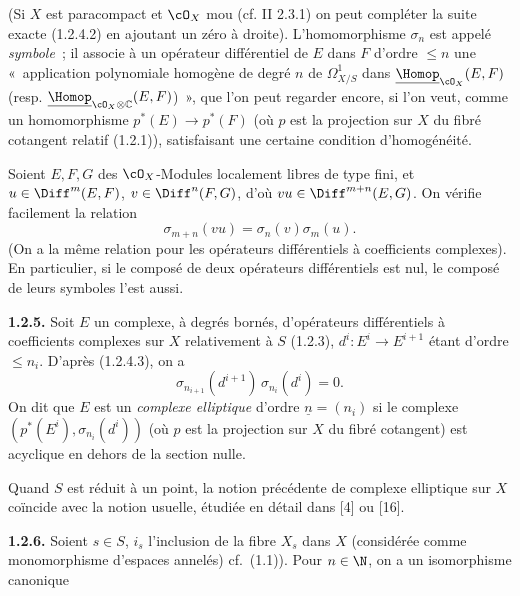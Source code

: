 (Si $X$ est
paracompact et $\cO_X$ mou (cf. II 2.3.1) on peut compléter la suite exacte (1.2.4.2) en ajoutant un zéro à droite). L'homomorphisme $\sigma_n$ est appelé \emph{symbole}~; il associe à un opérateur différentiel de $E$ dans $F$ d'ordre $\le n$ une «~application polynomiale homogène de degré $n$ de $\Omega^1_{X/S}$ dans $\underline{\Homop}_{\cO_X}(E,F)$ (resp. $\underline{\Homop}_{\cO_X\otimes\mathbb C}(E,F)$)~», que l'on peut regarder encore, si l'on veut, comme un homomorphisme $p^*(E)\longrightarrow p^*(F)$ (où $p$ est la projection sur $X$ du fibré cotangent relatif (1.2.1)), satisfaisant une certaine condition d'homogénéité.

Soient $E,F,G$ des $\cO_X$-Modules localement libres de type fini, et $u\in\Diff^m(E,F)$, $v\in\Diff^n(F,G)$, d'où $vu\in\Diff^{m+n}(E,G)$. On vérifie facilement la relation
\begin{equation}\tag{1.2.4.3}
  \sigma_{m+n}(vu)=\sigma_n(v)\sigma_m(u).
\end{equation}
(On a la même relation pour les opérateurs différentiels à coefficients complexes). En particulier, si le composé de deux opérateurs différentiels est nul, le composé de leurs symboles l'est aussi.

\textbf{1.2.5.} Soit $E$ un complexe, à degrés bornés, d'opérateurs différentiels à coefficients complexes sur $X$ relativement à $S$ (1.2.3), $d^i:E^i\longrightarrow E^{i+1}$ étant d'ordre $\le n_i$. D'après (1.2.4.3), on a
\[
  \sigma_{n_{i+1}}(d^{i+1})\,\sigma_{n_i}(d^i)=0.
\]
On dit que $E$ est un \emph{complexe elliptique} d'ordre $\underline{n}=(n_i)$ si le complexe $(p^*(E^i),\sigma_{n_i}(d^i))$ (où $p$ est la projection sur $X$ du fibré cotangent) est acyclique en dehors de la section nulle.

Quand $S$ est réduit à un point, la notion précédente de complexe elliptique sur $X$ coïncide avec la notion usuelle, étudiée en détail dans [4] ou [16].

\textbf{1.2.6.} Soient $s\in S$, $i_s$ l'inclusion de la fibre $X_s$ dans $X$ (considérée comme monomorphisme d'espaces annelés) cf.~(1.1)). Pour $n\in\N$, on a un isomorphisme canonique
